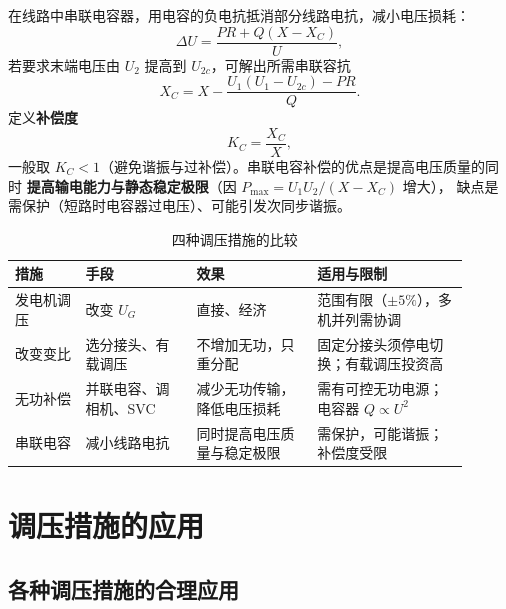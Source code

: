 在线路中串联电容器，用电容的负电抗抵消部分线路电抗，减小电压损耗：
\begin{equation}
  \Delta U=\frac{PR+Q\left(X-X_C\right)}{U},
\end{equation}
若要求末端电压由 $U_2$ 提高到 $U_{2c}$，可解出所需串联容抗
\begin{equation}
  X_C=X-\frac{U_1\left(U_1-U_{2c}\right)-PR}{Q}.
\end{equation}
定义\textbf{补偿度}
\begin{equation}
  K_C=\frac{X_C}{X},
\end{equation}
一般取 $K_C<1$（避免谐振与过补偿）。串联电容补偿的优点是提高电压质量的同时
\textbf{提高输电能力与静态稳定极限}（因 $P_{\max}=U_1U_2/(X-X_C)$ 增大），
缺点是需保护（短路时电容器过电压）、可能引发次同步谐振。

\begin{table}[htbp]
  \centering
  \caption{四种调压措施的比较}
  \small
  \begin{tabular}{@{}p{0.14\linewidth}p{0.22\linewidth}p{0.24\linewidth}p{0.30\linewidth}@{}}
    \toprule
    措施 & 手段 & 效果 & 适用与限制 \\
    \midrule
    发电机调压 & 改变 $U_G$ & 直接、经济 & 范围有限（$\pm5\%$），多机并列需协调 \\
    改变变比 & 选分接头、有载调压 & 不增加无功，只重分配 & 固定分接头须停电切换；有载调压投资高 \\
    无功补偿 & 并联电容、调相机、SVC & 减少无功传输，降低电压损耗 & 需有可控无功电源；电容器 $Q\propto U^{2}$ \\
    串联电容 & 减小线路电抗 & 同时提高电压质量与稳定极限 & 需保护，可能谐振；补偿度受限 \\
    \bottomrule
  \end{tabular}
\end{table}


\section{调压措施的应用}

\subsection{各种调压措施的合理应用}

